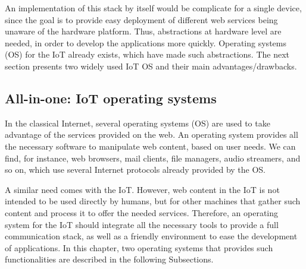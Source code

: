 An implementation of this stack by itself would be complicate for a single device, since the goal is to provide easy deployment of different web services being unaware of the hardware platform.
Thus, abstractions at hardware level are needed, in order to develop the applications more quickly.
Operating systems (OS) for the IoT already exists, which have made such abstractions.
The next section presents two widely used IoT OS and their main advantages/drawbacks.



\subsection{All-in-one: IoT operating systems}
\label{subsec:IoTOS}
In the classical Internet, several operating systems (OS) are used to take advantage of the services provided on the web.
An operating system provides all the necessary software to manipulate web content, based on user needs.
We can find, for instance, web browsers, mail clients, file managers, audio streamers, and so on, which use several Internet protocols already provided by the OS.

A similar need comes with the IoT.
However, web content in the IoT is not intended to be used directly by humans, but for other machines that gather such content and process it to offer the needed services.
Therefore, an operating system for the IoT should integrate all the necessary tools to provide a full communication stack, as well as a friendly environment to ease the development of applications.
In this chapter, two operating systems that provides such functionalities are described in the following Subsections.

